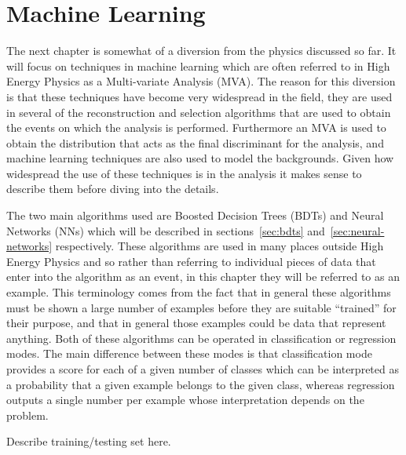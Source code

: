 \chapter{Machine Learning}%
\label{ch:ml}

The next chapter is somewhat of a diversion from the physics discussed so far.
It will focus on techniques in machine learning which are often referred to in
High Energy Physics as a Multi-variate Analysis (MVA). The reason for this
diversion is that these techniques have become very widespread in the field,
they are used in several of the reconstruction and selection algorithms that are
used to obtain the events on which the analysis is performed. Furthermore an MVA
is used to obtain the distribution that acts as the final discriminant for the
analysis, and machine learning techniques are also used to model the
backgrounds. Given how widespread the use of these techniques is in the analysis
it makes sense to describe them before diving into the details.

The two main algorithms used are Boosted Decision Trees (BDTs) and Neural
Networks (NNs) which will be described in sections~\ref{sec:bdts}
and~\ref{sec:neural-networks} respectively. These algorithms are used in many
places outside High Energy Physics and so rather than referring to individual
pieces of data that enter into the algorithm as an event, in this chapter they
will be referred to as an example. This terminology comes from the fact that in
general these algorithms must be shown a large number of examples before they
are suitable ``trained'' for their purpose, and that in general those examples
could be data that represent anything. Both of these algorithms can be operated
in classification or regression modes. The main difference between these modes
is that classification mode provides a score for each of a given number of
classes which can be interpreted as a probability that a given example belongs
to the given class, whereas regression outputs a single number per example whose
interpretation depends on the problem.

Describe training/testing set here.

